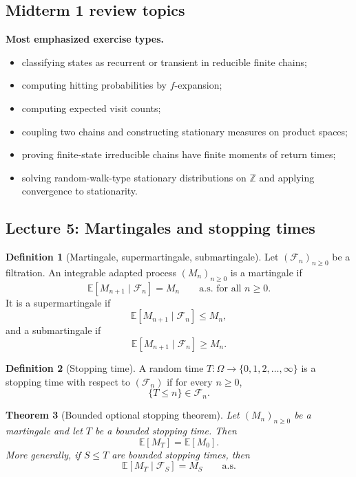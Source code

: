 \documentclass[11pt]{article}
\newtheorem{theorem}{Theorem}[section]
\theoremstyle{definition}
\newtheorem{definition}[theorem]{Definition}
\begin{document}
\subsection{Midterm 1 review topics}
\textbf{Most emphasized exercise types.}
\begin{itemize}[leftmargin=2em]
    \item classifying states as recurrent or transient in reducible finite chains;
    \item computing hitting probabilities by $f$-expansion;
    \item computing expected visit counts;
    \item coupling two chains and constructing stationary measures on product spaces;
    \item proving finite-state irreducible chains have finite moments of return times;
    \item solving random-walk-type stationary distributions on $\mathbb Z$ and applying convergence to stationarity.
\end{itemize}

\subsection{Lecture 5: Martingales and stopping times}

\begin{definition}[Martingale, supermartingale, submartingale]
Let $(\mathcal F_n)_{n\ge 0}$ be a filtration. An integrable adapted process $(M_n)_{n\ge 0}$ is a martingale if
\[
\mathbb E[M_{n+1}\mid \mathcal F_n]=M_n
\qquad \text{a.s. for all } n\ge 0.
\]
It is a supermartingale if
\[
\mathbb E[M_{n+1}\mid \mathcal F_n]\le M_n,
\]
and a submartingale if
\[
\mathbb E[M_{n+1}\mid \mathcal F_n]\ge M_n.
\]
\end{definition}

\begin{definition}[Stopping time]
A random time $T:\Omega\to\{0,1,2,\dots,\infty\}$ is a stopping time with respect to $(\mathcal F_n)$ if for every $n\ge 0$,
\[
\{T\le n\}\in \mathcal F_n.
\]
\end{definition}

\begin{theorem}[Bounded optional stopping theorem]
Let $(M_n)_{n\ge 0}$ be a martingale and let $T$ be a bounded stopping time. Then
\[
\mathbb E[M_T]=\mathbb E[M_0].
\]
More generally, if $S\le T$ are bounded stopping times, then
\[
\mathbb E[M_T\mid \mathcal F_S]=M_S
\qquad \text{a.s.}
\]
\end{theorem}
\end{document}
